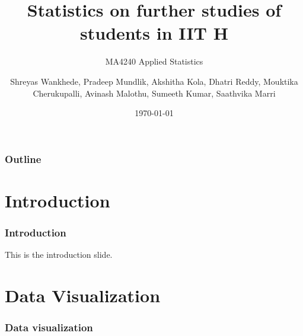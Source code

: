 \documentclass{beamer}
\title{Statistics on further studies of students in IIT H}
\subtitle{MA4240  Applied Statistics}
\author{Shreyas Wankhede, Pradeep Mundlik, Akshitha Kola, Dhatri Reddy, Mouktika Cherukupalli, Avinash Malothu, Sumeeth Kumar, Saathvika Marri}
\institute{IIT Hyderabad}
\date{\today}
\begin{document}
\begin{frame}
  \titlepage
\end{frame}

\begin{frame}
  \frametitle{Outline}
  \tableofcontents
\end{frame}

\section{Introduction}
\begin{frame}
  \frametitle{Introduction}
  This is the introduction slide.
\end{frame}

\section{Data Visualization}
\begin{frame}
  \frametitle{Data visualization}
  
\end{frame}
\end{document}
